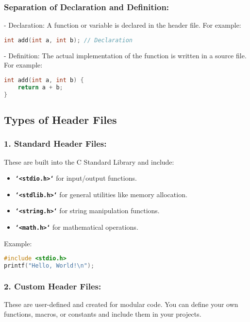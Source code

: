 \subsubsection{Separation of Declaration and Definition:}  
- Declaration: A function or variable is declared in the header file. For example:

\begin{lstlisting}[caption=Example C++, label={lst:listing-cpp}, language=C++, style=myStyle]
int add(int a, int b); // Declaration
\end{lstlisting}
- Definition: The actual implementation of the function is written in a source file. For example:
\begin{lstlisting}[caption=Example C++, label={lst:listing-cpp}, language=C++, style=myStyle]
int add(int a, int b) {
	return a + b;
}
\end{lstlisting}


\subsection{ Types of Header Files}
\subsubsection{1. Standard Header Files:  }
These are built into the C Standard Library and include:
\begin{itemize}
	\item\textbf{\texttt{`<stdio.h>`}} for input/output functions.
	\item\textbf{\texttt{`<stdlib.h>`}} for general utilities like memory allocation.
	\item\textbf{\texttt{`<string.h>`}} for string manipulation functions.
	\item\textbf{\texttt{`<math.h>`}} for mathematical operations.
\end{itemize}

Example:
\begin{lstlisting}[caption=Example C++, label={lst:listing-cpp}, language=C++, style=myStyle]
#include <stdio.h>
printf("Hello, World!\n");
\end{lstlisting}

\subsubsection{2. Custom Header Files: } 
These are user-defined and created for modular code. You can define your own functions, macros, or constants and include them in your projects.


